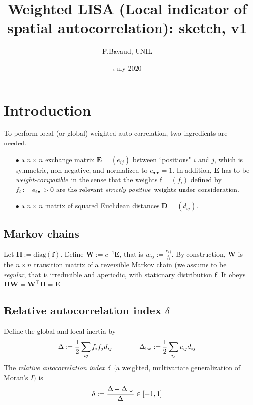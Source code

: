 \documentclass[11pt]{article}
\title{Weighted LISA (Local indicator of spatial autocorrelation): sketch, v1}
\author{F.Bavaud, UNIL}
\date{July 2020}
\begin{document}
\maketitle   

\section{Introduction}
To perform local (or global) weighted auto-correlation, two ingredients are needed: 
\begin{itemize}
  \item[$\bullet$] a $n\times n$  exchange matrix $\bm{E}=(e_{ij})$ between ``positions" $i$ and $j$, which is symmetric, non-negative, and normalized to $e_{\bullet\bullet}=1$. In addition,  $\bm{E}$ has to be {\em weight-compatible} in the sense 
  that the weights $\bm{f}=(f_i)$ defined by $f_i:=e_{i\bullet}>0$ are the relevant {\em strictly positive} weights under consideration. 
  \item[$\bullet$] a $n\times n$  matrix of squared Euclidean distances $\bm{D}=(d_{ij})$. 
\end{itemize}

 \subsection{Markov chains}
 Let $\bm{\Pi}:=\mbox{diag}(\bm{f})$. Define $\bm{W}:=c^{-1}\bm{E}$, that is $w_{ij}:=\frac{e_{ij}}{f_i}$. By construction, $\bm{W}$ is the $n\times n$ transition matrix of a reversible Markov chain (we assume to be {\em regular}, that is irreducible and aperiodic, with stationary distribution $\bm{f}$. It obeys $\bm{\Pi}\bm{W}=\bm{W}^\top\bm{\Pi}=\bm{E}$.
 
 
 
 \subsection{Relative autocorrelation index $\delta$}
 Define the global and local inertia by 
\begin{equation}
\label{ }
 \Delta:=\frac12\sum_{ij}f_if_jd_{ij}
 \qquad\qquad
  \Delta_{\mbox{\tiny loc}}:=\frac12\sum_{ij}e_{ij}d_{ij}
\end{equation} 
The {\em relative autocorrelation index $\delta$} (a weighted, multivariate generalization of  Moran's $I$) is 
\begin{equation}
\label{ }
\delta:=\frac{\Delta- \Delta_{\mbox{\tiny loc}}}{\Delta}\in [-1,1]
\end{equation}
 
\end{document}
